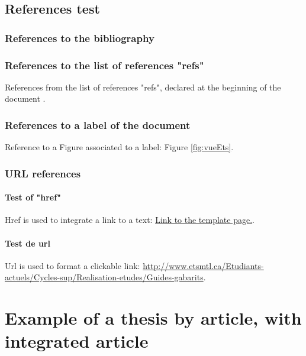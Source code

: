 \documentclass[letterpaper%
, twoside%
, 12pt%
,these%
, english%
,creativecommons,hyperref, withAlgo2e %
]{thETS}
\begin{document}
\section{References test}

\subsection{References to the bibliography}

\subsection{References to the list of references "refs"}

References from the list of references "refs", declared at the beginning of the document .

\subsection{References to a label of the document}

Reference to a Figure associated to a label: Figure \ref{fig:vueEts}.

\subsection{URL references}

\subsubsection{Test of "href"}

Href is used to integrate a link to a text:
\href{http://www.etsmtl.ca/Etudiants-actuels/Cycles-sup/Realisation-etudes/Guides-gabarits}{Link to the template page.}.

\subsubsection{Test de url}

Url is used to format a clickable link:
\url{http://www.etsmtl.ca/Etudiants-actuels/Cycles-sup/Realisation-etudes/Guides-gabarits}.

\chapter{Example of a thesis by article, with integrated article}
\end{document}
